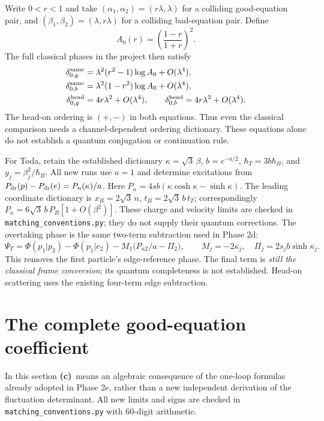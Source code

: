 \documentclass[11pt,a4paper]{article}
\newcommand{\Lc}{\textsf{\textbf{(c)}}}
\newcommand{\scr}[1]{\texttt{matching\_#1.py}}
\begin{document}
Write $0<r<1$ and take $(\alpha_1,\alpha_2)=(r\lambda,\lambda)$ for a
colliding good-equation pair, and $(\beta_1,\beta_2)=(\lambda,r\lambda)$ for
a colliding bad-equation pair. Define
\[
 A_0(r)=\left(\frac{1-r}{1+r}\right)^2.
\]
The full classical phases in the project then satisfy
\begin{align}
 \delta_{0,g}^{\rm same}&=\lambda^2(r^2-1)\log A_0+O(\lambda^4),\label{eq:classsame}\\
 \delta_{0,b}^{\rm same}&=\lambda^2(1-r^2)\log A_0+O(\lambda^4),\\
 \delta_{0,g}^{\rm head}&=4r\lambda^2+O(\lambda^4),\qquad
 \delta_{0,b}^{\rm head}=4r\lambda^2+O(\lambda^4).
\end{align}
The head-on ordering is $(+, -)$ in both equations. Thus even the classical
comparison needs a channel-dependent ordering dictionary. These equations
alone do not establish a quantum conjugation or continuation rule.

For Toda, retain the established dictionary
$\kappa=\sqrt3\,\beta$, $b=e^{-a/2}$, $\hbar_T=3b\hbar_B$,
and $y_j=\beta_j^2/\hbar_B$. All new runs use $a=1$ and determine excitations
from $P_{\rm dr}(p)-P_{\rm dr}(e)=P_n(\kappa)/a$.
Here $P_n=4s b(\kappa\cosh\kappa-\sinh\kappa)$.
The leading coordinate dictionary is $x_B=2\sqrt3\,n$,
$t_B=2\sqrt3\,b\,t_T$; correspondingly
$P_n=6\sqrt3\,b\,P_B[1+O(\beta^2)]$.
These charge and velocity limits are checked in \scr{conventions}; they
do not supply their quantum corrections.
The overtaking phase is the same two-term subtraction used in Phase 2d:
\begin{equation}
 \Psi_T=\Phi(p_1|p_2)-\Phi(p_1|e_2)
 -M_1\big(P_{n2}/a-\Pi_2\big),\qquad
 M_j=-2\kappa_j,\quad \Pi_j=2s_jb\sinh\kappa_j.
\end{equation}
This removes the first particle's edge-reference phase. The final term is
\emph{still the classical frame conversion}; its quantum completeness is not
established. Head-on scattering uses the existing four-term edge subtraction.

\section{The complete good-equation coefficient}
In this section \Lc\ means an algebraic consequence of the one-loop formulas
already adopted in Phase 2e, rather than a new independent derivation of the
fluctuation determinant. All new limits and signs are checked in
\scr{conventions} with 60-digit arithmetic.
\end{document}
